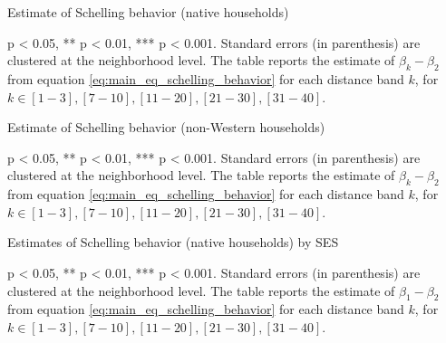 \documentclass[../main.tex]{subfiles}
\begin{document}
\begin{table}[H]
    \caption{Estimate of Schelling behavior (native households)}
    \label{tab:main_results_full}
    \centering
    \begin{adjustbox}{width = 1.1\linewidth, center}
    \begin{threeparttable}
        
    \begin{tablenotes}[flushleft]
    \item \scriptsize * p < 0.05, ** p < 0.01, *** p < 0.001. Standard errors (in parenthesis) are clustered at the neighborhood level. The table reports the estimate of $\beta_k - \beta_2$ from equation \ref{eq:main_eq_schelling_behavior} for each distance band $k$, for $k\in {[1-3], [7-10], [11-20], [21-30], [31-40]}$. 
    \end{tablenotes}
    \end{threeparttable}
    \end{adjustbox}  
\end{table}
\begin{table}[H]
    \caption{Estimate of Schelling behavior (non-Western households)}
    \label{tab:main_results_full_non_west}
    \centering
    \begin{adjustbox}{width = 1.1\linewidth, center}
    \begin{threeparttable}
        
    \begin{tablenotes}[flushleft]
    \item \scriptsize * p < 0.05, ** p < 0.01, *** p < 0.001. Standard errors (in parenthesis) are clustered at the neighborhood level. The table reports the estimate of $\beta_k - \beta_2$ from equation \ref{eq:main_eq_schelling_behavior} for each distance band $k$, for $k\in {[1-3], [7-10], [11-20], [21-30], [31-40]}$. 
    \end{tablenotes}
    \end{threeparttable}
    \end{adjustbox}
\end{table}

\begin{table}[H]
    \caption{Estimates of Schelling behavior (native households) by SES}
    \label{tab:main_results_ses_full}
    \begin{adjustbox}{width = 1.2\linewidth, center}    
    \begin{threeparttable}
            
    \begin{tablenotes}[flushleft]
    \item \scriptsize * p < 0.05, ** p < 0.01, *** p < 0.001. Standard errors (in parenthesis) are clustered at the neighborhood level. The table reports the estimate of $\beta_1 - \beta_2$ from equation \ref{eq:main_eq_schelling_behavior} for each distance band $k$, for $k\in {[1-3], [7-10], [11-20], [21-30], [31-40]}$. 
    \end{tablenotes}
    \end{threeparttable}
    \end{adjustbox}
\end{table}
\end{document}
